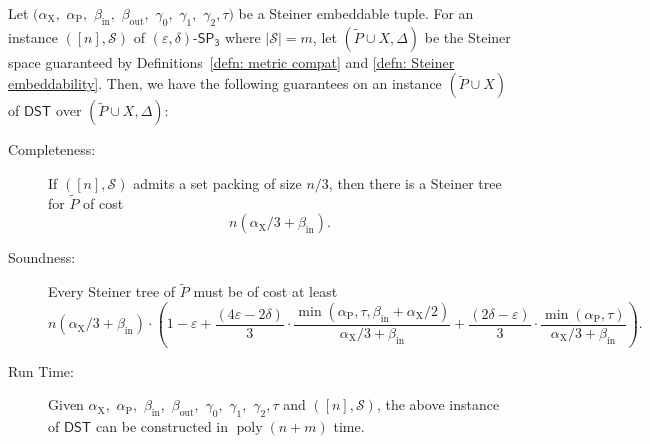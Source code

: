 \documentclass{theoretics}
\DeclareMathOperator{\poly}{poly}
\newcommand{\1}{\textbf{1}}
\newcommand{\setpT}{$\mathsf{SP_3}$\xspace}
\newcommand{\dst}{$\mathsf{DST}$\xspace}
\newcommand{\td}{\tau}
\newcommand{\srd}{\alpha_{\text{X}}}
\newcommand{\trd}{\alpha_{\text{P}}}
\renewcommand{\tilde}{\widetilde}
\begin{document}
\begin{theorem} \label{thm: graph hardness}
Let $(\srd,$ $\trd,$ $\beta_{\text{in}},$ $\beta_{\text{out}},$ $\gamma_0,$ $\gamma_1,$ $\gamma_2,\td)$ be a Steiner embeddable tuple.
For an instance  $([n],\mathcal{S})$ of $(\varepsilon,\delta)$-\setpT where $|\mathcal{S}|=m$, let $(\tilde{P}\cup X,\Delta)$ be the Steiner space guaranteed by Definitions~\ref{defn: metric compat} and \ref{defn: Steiner embeddability}. Then,  we have the following guarantees on an instance $(\tilde{P} \cup X)$ of \dst over $(\tilde{P}\cup X,\Delta)$:
\begin{description}
        \item[Completeness:] If $([n],\mathcal{S})$ admits a set packing of size $n/3$, then there is a Steiner tree for $\tilde{P}$ of cost $$n(\srd/3+\beta_{\text{in}}).$$
        \item[Soundness:] Every Steiner tree of $\tilde{P}$ must be of cost at least
        $$n(\srd/3+\beta_{\text{in}})\cdot \left(1 - \varepsilon  + \frac{(4\varepsilon  - 2\delta)}{3} \cdot \frac{\min(\trd, \td, \beta_{\text{in}} + \srd/2)}{\srd/3+\beta_{\text{in}}} + \frac{(2\delta  - \varepsilon)}{3} \cdot \frac{\min(\trd, \td)}{\srd/3+\beta_{\text{in}}} \right).$$
        
        
        \item[Run Time:] Given $\srd,$ $\trd,$ $\beta_{\text{in}},$ $\beta_{\text{out}},$ $\gamma_0,$ $\gamma_1,$ $\gamma_2,\td$ and $([n],\mathcal{S})$, the above instance of \dst can be constructed in $\poly(n+m)$ time. 
        \end{description}
\end{theorem}
\end{document}
